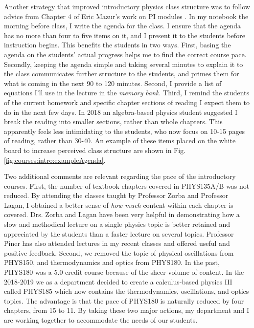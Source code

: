 \documentclass[../../main.tex]{subfiles}
\begin{document}
Another strategy that improved introductory physics class structure was to follow advice from Chapter 4 of Eric Mazur's work on PI modules \cite{mazur}.  In my notebook the morning before class, I write the agenda for the class.  I ensure that the agenda has no more than four to five items on it, and I present it to the students before instruction begins.  This benefits the students in two ways.  First, basing the agenda on the students' actual progress helps me to find the correct course pace.  Secondly, keeping the agenda simple and taking several minutes to explain it to the class communicates further structure to the students, and primes them for what is coming in the next 90 to 120 minutes.  Second, I provide a list of equations I'll use in the lecture in the \textit{memory bank}.  Third, I remind the students of the current homework and specific chapter sections of reading I expect them to do in the next few days.  In 2018 an algebra-based physics student suggested I break the reading into smaller sections, rather than whole chapters.  This apparently feels less intimidating to the students, who now focus on 10-15 pages of reading, rather than 30-40.  An example of these items placed on the white board to increase perceived class structure are shown in Fig. \ref{fig:courses:intro:exampleAgenda}. \\ \hspace{0.1cm}

Two additional comments are relevant regarding the pace of the introductory courses.  First, the number of textbook chapters covered in PHYS135A/B was not reduced.  By attending the classes taught by Professor Zorba and Professor Lagan, I obtained a better sense of \textit{how much} content within each chapter is covered.  Drs. Zorba and Lagan have been very helpful in demonstrating how a slow and methodical lecture on a single physics topic is better retained and appreciated by the students than a faster lecture on several topics.  Professor Piner has also attended lectures in my recent classes and offered useful and positive feedback.  Second, we removed the topic of physical oscillations from PHYS150, and thermodynamics and optics from PHYS180.  In the past, PHYS180 was a 5.0 credit course because of the sheer volume of content.  In the 2018-2019 we as a department decided to create a calculus-based physics III called PHYS185 which now contains the thermodynamics, oscillations, and optics topics.  The advantage is that the pace of PHYS180 is naturally reduced by four chapters, from 15 to 11.  By taking these two major actions, my department and I are working together to accommodate the needs of our students. \\ \hspace{0.1cm}
\end{document}
